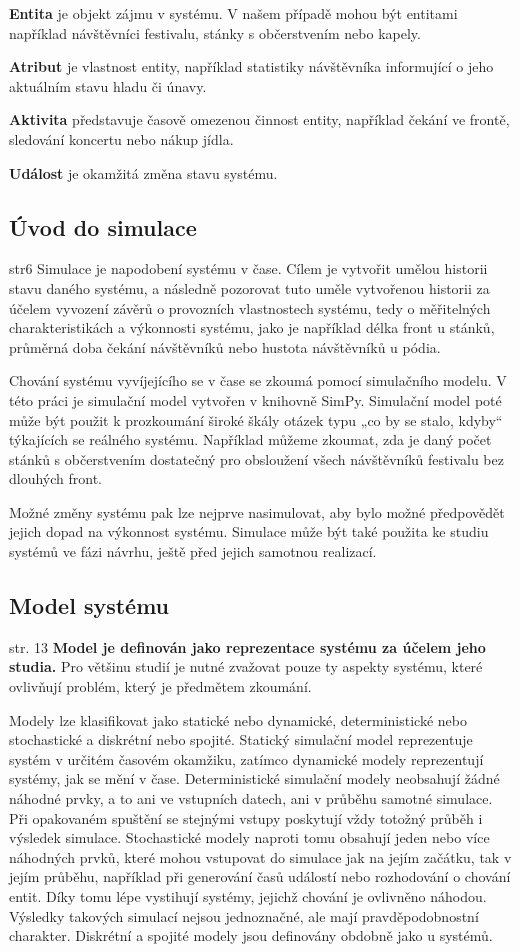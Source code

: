 \documentclass[12pt,a4paper]{article}
\begin{document}
\noindent \textbf{Entita} je objekt zájmu v systému. V našem případě mohou být entitami například návštěvníci festivalu, stánky s občerstvením nebo kapely.

\noindent \textbf{Atribut} je vlastnost entity, například statistiky návštěvníka informující o jeho aktuálním stavu hladu či únavy.

\noindent \textbf{Aktivita} představuje časově omezenou činnost entity, například čekání ve frontě, sledování koncertu nebo nákup jídla.

\noindent \textbf{Událost} je okamžitá změna stavu systému. 


\subsection{Úvod do simulace}  str6
Simulace je napodobení systému v čase. Cílem je vytvořit umělou historii stavu daného systému, a následně pozorovat tuto uměle vytvořenou historii za účelem vyvození závěrů o provozních vlastnostech systému, tedy o měřitelných charakteristikách a výkonnosti systému, jako je například délka front u stánků, průměrná doba čekání návštěvníků nebo hustota návštěvníků u pódia. 

Chování systému vyvíjejícího se v čase se zkoumá pomocí simulačního modelu. V této práci je simulační model vytvořen v knihovně SimPy. Simulační model poté může být použit k prozkoumání široké škály otázek typu „co by se stalo, kdyby“ týkajících se reálného systému. Například můžeme zkoumat, zda je daný počet stánků s občerstvením dostatečný pro obsloužení všech návštěvníků festivalu bez dlouhých front. 

Možné změny systému pak lze nejprve nasimulovat, aby bylo možné předpovědět jejich dopad na výkonnost systému. Simulace může být také použita ke studiu systémů ve fázi návrhu, ještě před jejich samotnou realizací.

\subsection{Model systému} str. 13
{\bf Model je definován jako reprezentace systému za účelem jeho studia.} Pro většinu studií je nutné zvažovat pouze ty aspekty systému, které ovlivňují problém, který je předmětem zkoumání. 

Modely lze klasifikovat jako statické nebo dynamické, deterministické nebo stochastické a diskrétní nebo spojité. Statický simulační model reprezentuje systém v určitém časovém okamžiku, zatímco dynamické modely reprezentují systémy, jak se mění v čase. Deterministické simulační modely neobsahují žádné náhodné prvky, a to ani ve vstupních datech, ani v průběhu samotné simulace. Při opakovaném spuštění se stejnými vstupy poskytují vždy totožný průběh i výsledek simulace. Stochastické modely naproti tomu obsahují jeden nebo více náhodných prvků, které mohou vstupovat do simulace jak na jejím začátku, tak v jejím průběhu, například při generování časů událostí nebo rozhodování o chování entit. Díky tomu lépe vystihují systémy, jejichž chování je ovlivněno náhodou. Výsledky takových simulací nejsou jednoznačné, ale mají pravděpodobnostní charakter. Diskrétní a spojité modely jsou definovány obdobně jako u systémů.
\end{document}
